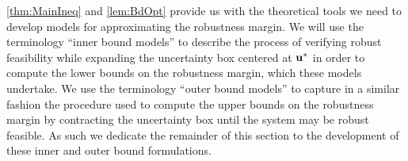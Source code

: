 \cref{thm:MainIneq} and \cref{lem:BdOpt} provide us with the theoretical tools we need to develop models for approximating the robustness margin.
We will use the terminology \enquote{inner bound models} to describe the process of verifying robust feasibility while expanding the uncertainty box centered at $\mathbf{u}^*$ in order to compute the lower bounds on the robustness margin, which these models undertake. 
We use the terminology \enquote{outer bound models} to capture in a similar fashion the procedure used to compute the upper bounds on the robustness margin by contracting the uncertainty box until the system may be robust feasible. 
As such we dedicate the remainder of this section to the development of these inner and outer bound formulations. 
